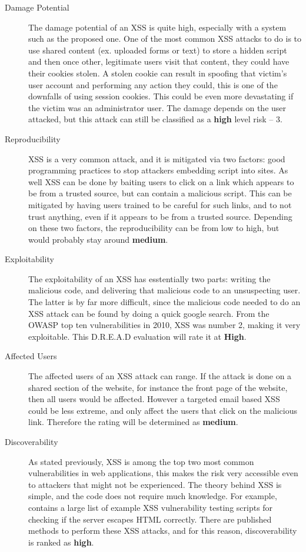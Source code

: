 \documentclass{article}
\numberwithin{equation}{section} %
\numberwithin{figure}{section} %
\numberwithin{table}{section} %
\begin{document}
\begin{description}
	\item[Damage Potential]
		The damage potential of an XSS is quite high, especially with a system such as the proposed one.  One of the most common XSS attacks to do is to use shared content (ex. uploaded forms or text) to store a hidden script and then once other, legitimate users visit that content, they could have their cookies stolen.  A stolen cookie can result in spoofing that victim's user account and performing any action they could, this is one of the downfalls of using session cookies.  This could be even more devastating if the victim was an administrator user.  The damage depends on the user attacked, but this attack can still be classified as a \textbf{high} level risk -- 3.
	\item[Reproducibility]
		XSS is a very common attack, and it is mitigated via two factors: good programming practices to stop attackers embedding script into sites.  As well XSS can be done by baiting users to click on a link which appears to be from a trusted source, but can contain a malicious script.  This can be mitigated by having users trained to be careful for such links, and to not trust anything, even if it appears to be from a trusted source.  Depending on these two factors, the reproducibility can be from low to high, but would probably stay around \textbf{medium}.
	\item[Exploitability]
		The exploitability of an XSS has esstentially two parts: writing the malicious code, and delivering that malicious code to an unsuspecting user.  The latter is by far more difficult, since the malicious code needed to do an XSS attack can be found by doing a quick google search.  From the OWASP top ten vulnerabilities in 2010, XSS was number 2\cite{owasptopten}, making it very exploitable.  This D.R.E.A.D evaluation will rate it at \textbf{High}.
	\item[Affected Users]
		The affected users of an XSS attack can range.  If the attack is done on a shared section of the website, for instance the front page of the website, then all users would be affected.  However a targeted email based XSS could be less extreme, and only affect the users that click on the malicious link.  Therefore the rating will be determined as \textbf{medium}.
	\item[Discoverability]
		As stated previously, XSS is among the top two most common vulnerabilities in web applications, this makes the risk very accessible even to attackers that might not be experienced.  The theory behind XSS is simple, and the code does not require much knowledge.  For example, \cite{xss} contains a large list of example XSS vulnerability testing scripts for checking if the server escapes HTML correctly.  There are published methods to perform these XSS attacks, and for this reason, discoverability is ranked as \textbf{high}.
\end{description}
\end{document}
